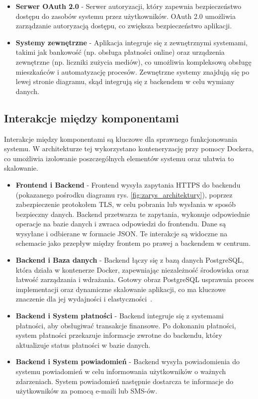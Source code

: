 \begin{itemize}
	\item \textbf{Serwer OAuth 2.0} - Serwer autoryzacji, który zapewnia bezpieczeństwo dostępu do zasobów systemu przez użytkowników. OAuth 2.0 umożliwia zarządzanie autoryzacją dostępu, co zwiększa bezpieczeństwo aplikacji.

	\item \textbf{Systemy zewnętrzne} - Aplikacja integruje się z zewnętrznymi systemami, takimi jak bankowość (np. obsługa płatności online) oraz urządzenia zewnętrzne (np. liczniki zużycia mediów), co umożliwia kompleksową obsługę mieszkańców i automatyzację procesów. Zewnętrzne systemy znajdują się po lewej stronie diagramu, skąd integrują się z backendem w celu wymiany danych.


\end{itemize}

\subsection{Interakcje między komponentami}

Interakcje między komponentami są kluczowe dla sprawnego funkcjonowania systemu. W architekturze tej wykorzystano konteneryzację przy pomocy Dockera, co umożliwia izolowanie poszczególnych elementów systemu oraz ułatwia to skalowanie.

\begin{itemize} 
	\item \textbf{Frontend i Backend} - Frontend wysyła zapytania HTTPS do backendu (pokazanego pośrodku diagramu rys. \ref{fig:zarys_architektury}), poprzez zabezpieczenie protokołem TLS, w celu pobrania lub wysłania w sposób bezpieczny danych. Backend przetwarza te zapytania, wykonuje odpowiednie operacje na bazie danych i zwraca odpowiedzi do frontendu. Dane są wysyłane i odbierane w formacie JSON. Te interakcje są widoczne na schemacie jako przepływ między frontem po prawej a backendem w centrum.
	
	\item \textbf{Backend i Baza danych} - Backend łączy się z bazą danych PostgreSQL, która działa w kontenerze Docker, zapewniając niezależność środowiska oraz łatwość zarządzania i wdrażania. Gotowy obraz PostgreSQL usprawnia proces implementacji oraz dynamiczne skalowanie aplikacji, co ma kluczowe znaczenie dla jej wydajności i elastyczności~\cite{Docker-docs,vsupalov}.

	\item \textbf{Backend i System płatności} - Backend integruje się z systemami płatności, aby obsługiwać transakcje finansowe. Po dokonaniu płatności, system płatności przekazuje informacje zwrotne do backendu, który aktualizuje status płatności w bazie danych.

	\item \textbf{Backend i System powiadomień} - Backend wysyła powiadomienia do systemu powiadomień w celu informowania użytkowników o ważnych zdarzeniach. System powiadomień następnie dostarcza te informacje do użytkowników za pomocą e-maili lub SMS-ów.

\end{itemize}


